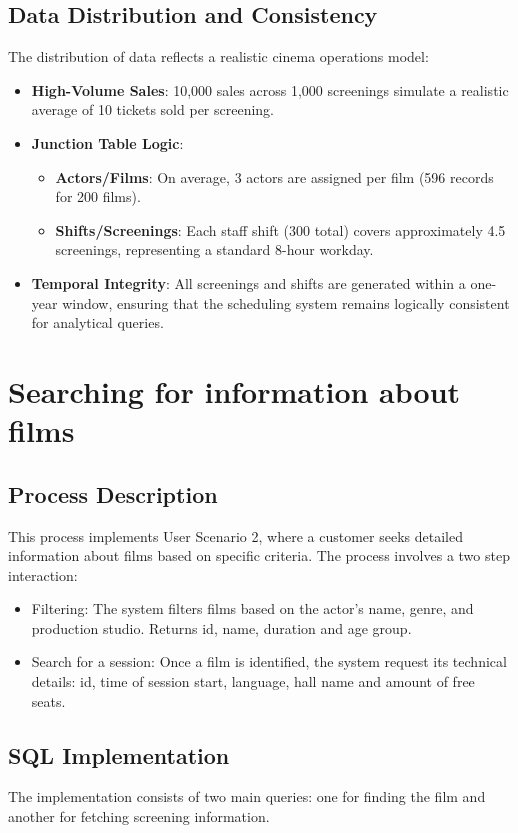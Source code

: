 \documentclass[11pt, a4paper]{article}
\begin{document}
\subsection{Data Distribution and Consistency}
The distribution of data reflects a realistic cinema operations model:
\begin{itemize}
    \item \textbf{High-Volume Sales}: 10,000 sales across 1,000 screenings simulate a realistic average of 10 tickets sold per screening.
    \item \textbf{Junction Table Logic}:
    \begin{itemize}
        \item \textbf{Actors/Films}: On average, 3 actors are assigned per film (596 records for 200 films).
        \item \textbf{Shifts/Screenings}: Each staff shift (300 total) covers approximately 4.5 screenings, representing a standard 8-hour workday.
    \end{itemize}
    \item \textbf{Temporal Integrity}: All screenings and shifts are generated within a one-year window, ensuring that the scheduling system remains logically consistent for analytical queries.
\end{itemize}
\newpage


\section{Searching for information about films}
\subsection{Process Description}

This process implements User Scenario 2, where a customer seeks detailed information about films based on
specific criteria. The process involves a two step interaction:

\begin{itemize}
    \item Filtering: The system filters films based on the actor's name, genre, and production studio. Returns id, name, duration and age group.
    \item Search for a session: Once a film is identified, the system request its technical details: id, time of session start, language, hall name and amount of free seats.
\end{itemize}

\subsection{SQL Implementation}
The implementation consists of two main queries: one for finding the film and another for fetching screening information.
\end{document}
